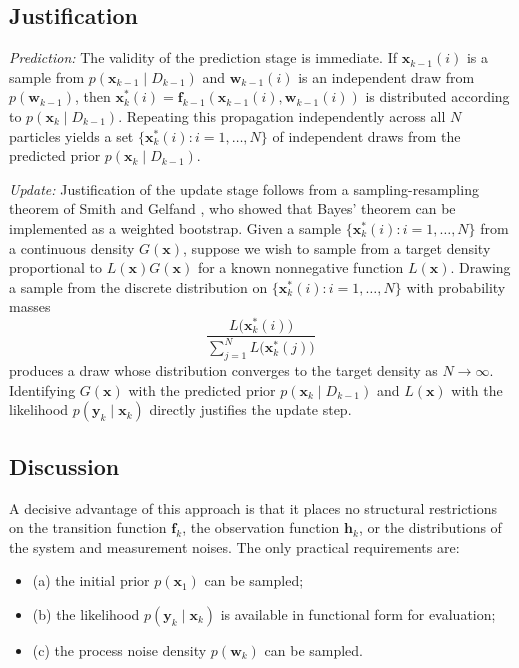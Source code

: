 \subsection{Justification}\label{sec:just}

\emph{Prediction:} The validity of the prediction stage is immediate. If $\bm{x}_{k-1}(i)$ is a sample from $p(\bm{x}_{k-1} \mid D_{k-1})$ and $\bm{w}_{k-1}(i)$ is an independent draw from $p(\bm{w}_{k-1})$, then $\bm{x}_k^*(i) = \bm{f}_{k-1}(\bm{x}_{k-1}(i), \bm{w}_{k-1}(i))$ is distributed according to $p(\bm{x}_k \mid D_{k-1})$. Repeating this propagation independently across all $N$ particles yields a set $\{\bm{x}_k^*(i) : i = 1, \dots, N\}$ of independent draws from the predicted prior $p(\bm{x}_k \mid D_{k-1})$.

\emph{Update:} Justification of the update stage follows from a sampling-resampling theorem of Smith and Gelfand \cite{r14}, who showed that Bayes' theorem can be implemented as a weighted bootstrap. Given a sample $\{\bm{x}_k^*(i) : i = 1, \dots, N\}$ from a continuous density $G(\bm{x})$, suppose we wish to sample from a target density proportional to $L(\bm{x}) G(\bm{x})$ for a known nonnegative function $L(\bm{x})$. Drawing a sample from the discrete distribution on $\{\bm{x}_k^*(i) : i = 1, \dots, N\}$ with probability masses
\begin{equation*}
\frac{L\bigl(\bm{x}_k^*(i)\bigr)}{\sum_{j=1}^N L\bigl(\bm{x}_k^*(j)\bigr)}
\end{equation*}
produces a draw whose distribution converges to the target density as $N \to \infty$. Identifying $G(\bm{x})$ with the predicted prior $p(\bm{x}_k \mid D_{k-1})$ and $L(\bm{x})$ with the likelihood $p(\bm{y}_k \mid \bm{x}_k)$ directly justifies the update step.

\subsection{Discussion}\label{sec:disc}

A decisive advantage of this approach is that it places no structural restrictions on the transition function $\bm{f}_k$, the observation function $\bm{h}_k$, or the distributions of the system and measurement noises. The only practical requirements are:

\begin{itemize}
\item (a) the initial prior $p(\bm{x}_1)$ can be sampled;
\item (b) the likelihood $p(\bm{y}_k \mid \bm{x}_k)$ is available in functional form for evaluation;
\item (c) the process noise density $p(\bm{w}_k)$ can be sampled.
\end{itemize}

